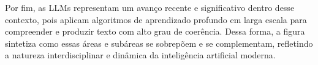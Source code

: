 Por fim, as LLMs representam um avanço recente e significativo dentro desse contexto, pois aplicam algoritmos de aprendizado profundo em larga escala para compreender e produzir texto com alto grau de coerência. Dessa forma, a figura sintetiza como essas áreas e subáreas se sobrepõem e se complementam, refletindo a natureza interdisciplinar e dinâmica da inteligência artificial moderna.